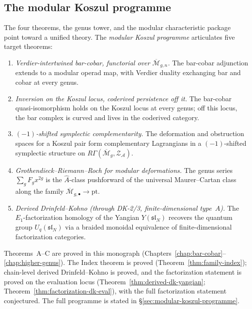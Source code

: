 \subsection{The modular Koszul programme}

The four theorems, the genus tower, and the modular characteristic
package point toward a unified theory.  The \emph{modular Koszul
programme} articulates five target theorems:

\begin{enumerate}
\item[$A_{\mathrm{mod}}$.]
  \emph{Verdier-intertwined bar-cobar, functorial over
  $\overline{\mathcal{M}}_{g,n}$.}
  The bar-cobar adjunction extends to a modular operad map,
  with Verdier duality exchanging bar and cobar at every genus.

\item[$B_{\mathrm{mod}}$.]
  \emph{Inversion on the Koszul locus, coderived persistence off it.}
  The bar-cobar quasi-isomorphism holds on the Koszul locus at
  every genus; off this locus, the bar complex is curved and lives
  in the coderived category.

\item[$C_{\mathrm{mod}}$.]
  \emph{$(-1)$-shifted symplectic complementarity.}
  The deformation and obstruction spaces for a Koszul pair form
  complementary Lagrangians in a $(-1)$-shifted symplectic
  structure on $R\Gamma(\overline{\mathcal{M}}_g,
  \mathcal{Z}_{\mathcal{A}})$.

\item[\textbf{Index}.]
  \emph{Grothendieck--Riemann--Roch for modular deformations.}
  The genus series $\sum_g F_g x^{2g}$ is the $\hat{A}$-class
  pushforward of the universal Maurer--Cartan class along the
  family $\overline{\mathcal{M}}_{g,\bullet} \to \mathrm{pt}$.

\item[\textbf{DK}.]
  \emph{Derived Drinfeld--Kohno \textup{(}through DK-2/3,
  finite-dimensional type~$A$\textup{)}.}
  The $E_1$-factorization homology of the Yangian $Y(\mathfrak{sl}_N)$
  recovers the quantum group $U_q(\mathfrak{sl}_N)$ via a braided
  monoidal equivalence of finite-dimensional factorization categories.
\end{enumerate}

Theorems~A--C are proved in this monograph
(Chapters~\ref{chap:bar-cobar}--\ref{chap:higher-genus}).
The Index theorem is proved (Theorem~\ref{thm:family-index});
chain-level derived Drinfeld--Kohno is proved, and the
factorization statement is proved on the evaluation locus
(Theorem~\ref{thm:derived-dk-yangian};
Theorem~\ref{thm:factorization-dk-eval}), with the full
factorization statement conjectured.
The full programme is stated in
\S\ref{sec:modular-koszul-programme}.

